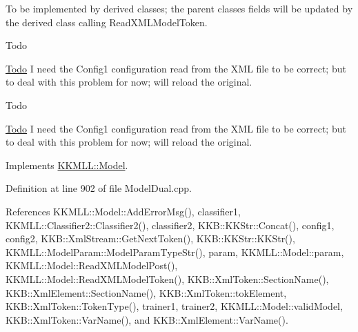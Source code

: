 To be implemented by derived classes; the parent classes fields will be updated by the derived class calling Read\+X\+M\+L\+Model\+Token. 

\begin{DoxyRefDesc}{Todo}
\item[\hyperlink{todo__todo000010}{Todo}]I need the Config1 configuration read from the X\+ML file to be correct; but to deal with this problem for now; will reload the original. \end{DoxyRefDesc}


\begin{DoxyRefDesc}{Todo}
\item[\hyperlink{todo__todo000011}{Todo}]I need the Config1 configuration read from the X\+ML file to be correct; but to deal with this problem for now; will reload the original. \end{DoxyRefDesc}


Implements \hyperlink{class_k_k_m_l_l_1_1_model_ab7f1d1441936048db8cec7e9ec987f34}{K\+K\+M\+L\+L\+::\+Model}.



Definition at line 902 of file Model\+Dual.\+cpp.



References K\+K\+M\+L\+L\+::\+Model\+::\+Add\+Error\+Msg(), classifier1, K\+K\+M\+L\+L\+::\+Classifier2\+::\+Classifier2(), classifier2, K\+K\+B\+::\+K\+K\+Str\+::\+Concat(), config1, config2, K\+K\+B\+::\+Xml\+Stream\+::\+Get\+Next\+Token(), K\+K\+B\+::\+K\+K\+Str\+::\+K\+K\+Str(), K\+K\+M\+L\+L\+::\+Model\+Param\+::\+Model\+Param\+Type\+Str(), param, K\+K\+M\+L\+L\+::\+Model\+::param, K\+K\+M\+L\+L\+::\+Model\+::\+Read\+X\+M\+L\+Model\+Post(), K\+K\+M\+L\+L\+::\+Model\+::\+Read\+X\+M\+L\+Model\+Token(), K\+K\+B\+::\+Xml\+Token\+::\+Section\+Name(), K\+K\+B\+::\+Xml\+Element\+::\+Section\+Name(), K\+K\+B\+::\+Xml\+Token\+::tok\+Element, K\+K\+B\+::\+Xml\+Token\+::\+Token\+Type(), trainer1, trainer2, K\+K\+M\+L\+L\+::\+Model\+::valid\+Model, K\+K\+B\+::\+Xml\+Token\+::\+Var\+Name(), and K\+K\+B\+::\+Xml\+Element\+::\+Var\+Name().


